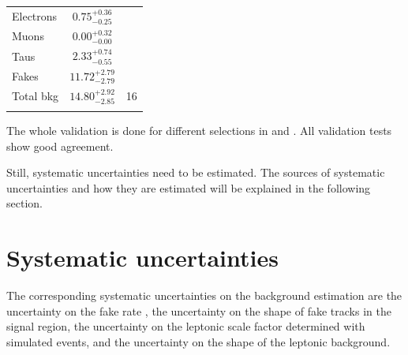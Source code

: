 \begin{table}[!b]
{\begin{tabular}{l|c |c}
\midrule
Electrons                                                      &       $0.75^{ + 0.36}_{ - 0.25}$            &                \\
Muons                                                          &       $0.00^{ + 0.32}_{- 0.00}$            &            \\
Taus                                                           &       $2.33^{ + 0.74}_{- 0.55}$            &          \\
Fakes                                                          &       $11.72^{ + 2.79}_{- 2.79}$            &          \\
\midrule
Total bkg                                                      &       $14.80^{ + 2.92}_{- 2.85}$            &  16        \\
\bottomrule
\multicolumn{3}{c}{} \\
\end{tabular}}
\end{table}


The whole validation is done for different selections in \pt and \ias.
All validation tests show good agreement.

Still, systematic uncertainties need to be estimated.
The sources of systematic uncertainties and how they are estimated will be explained in the following section.

\section{Systematic uncertainties}
\label{sec:SysUncertaintiesBkg}

The corresponding systematic uncertainties on the background estimation are the uncertainty on the fake rate \fakerate, the uncertainty on the \ias shape of fake tracks in the signal region, the uncertainty on the leptonic scale factor \leptonscalefactor determined with simulated events, and the uncertainty on the \ias shape of the leptonic background.  

